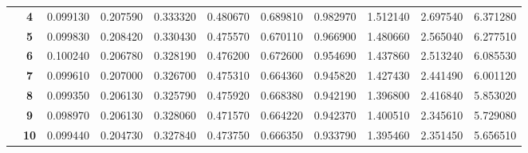 \begin{table}[h]
{\begin{tabular}{ccccccccccc}
\multicolumn{1}{c|}{} & \multicolumn{1}{c|}{\textbf{4}} & \multicolumn{1}{c|}{0.099130} & \multicolumn{1}{c|}{0.207590} & \multicolumn{1}{c|}{0.333320} & \multicolumn{1}{c|}{0.480670} & \multicolumn{1}{c|}{0.689810} & \multicolumn{1}{c|}{0.982970} & \multicolumn{1}{c|}{1.512140} & \multicolumn{1}{c|}{2.697540} & \multicolumn{1}{c|}{6.371280} \\ \cline{2-11}
\multicolumn{1}{c|}{} & \multicolumn{1}{c|}{\textbf{5}} & \multicolumn{1}{c|}{0.099830} & \multicolumn{1}{c|}{0.208420} & \multicolumn{1}{c|}{0.330430} & \multicolumn{1}{c|}{0.475570} & \multicolumn{1}{c|}{0.670110} & \multicolumn{1}{c|}{0.966900} & \multicolumn{1}{c|}{1.480660} & \multicolumn{1}{c|}{2.565040} & \multicolumn{1}{c|}{6.277510} \\ \cline{2-11}
\multicolumn{1}{c|}{} & \multicolumn{1}{c|}{\textbf{6}} & \multicolumn{1}{c|}{0.100240} & \multicolumn{1}{c|}{0.206780} & \multicolumn{1}{c|}{0.328190} & \multicolumn{1}{c|}{0.476200} & \multicolumn{1}{c|}{0.672600} & \multicolumn{1}{c|}{0.954690} & \multicolumn{1}{c|}{1.437860} & \multicolumn{1}{c|}{2.513240} & \multicolumn{1}{c|}{6.085530} \\ \cline{2-11}
\multicolumn{1}{c|}{} & \multicolumn{1}{c|}{\textbf{7}} & \multicolumn{1}{c|}{0.099610} & \multicolumn{1}{c|}{0.207000} & \multicolumn{1}{c|}{0.326700} & \multicolumn{1}{c|}{0.475310} & \multicolumn{1}{c|}{0.664360} & \multicolumn{1}{c|}{0.945820} & \multicolumn{1}{c|}{1.427430} & \multicolumn{1}{c|}{2.441490} & \multicolumn{1}{c|}{6.001120} \\ \cline{2-11}
\multicolumn{1}{c|}{} & \multicolumn{1}{c|}{\textbf{8}} & \multicolumn{1}{c|}{0.099350} & \multicolumn{1}{c|}{0.206130} & \multicolumn{1}{c|}{0.325790} & \multicolumn{1}{c|}{0.475920} & \multicolumn{1}{c|}{0.668380} & \multicolumn{1}{c|}{0.942190} & \multicolumn{1}{c|}{1.396800} & \multicolumn{1}{c|}{2.416840} & \multicolumn{1}{c|}{5.853020} \\ \cline{2-11}
\multicolumn{1}{c|}{} & \multicolumn{1}{c|}{\textbf{9}} & \multicolumn{1}{c|}{0.098970} & \multicolumn{1}{c|}{0.206130} & \multicolumn{1}{c|}{0.328060} & \multicolumn{1}{c|}{0.471570} & \multicolumn{1}{c|}{0.664220} & \multicolumn{1}{c|}{0.942370} & \multicolumn{1}{c|}{1.400510} & \multicolumn{1}{c|}{2.345610} & \multicolumn{1}{c|}{5.729080} \\ \cline{2-11}
\multicolumn{1}{c|}{} & \multicolumn{1}{c|}{\textbf{10}} & \multicolumn{1}{c|}{0.099440} & \multicolumn{1}{c|}{0.204730} & \multicolumn{1}{c|}{0.327840} & \multicolumn{1}{c|}{0.473750} & \multicolumn{1}{c|}{0.666350} & \multicolumn{1}{c|}{0.933790} & \multicolumn{1}{c|}{1.395460} & \multicolumn{1}{c|}{2.351450} & \multicolumn{1}{c|}{5.656510} \\ \cline{2-11}
\end{tabular}%
}
\end{table}

